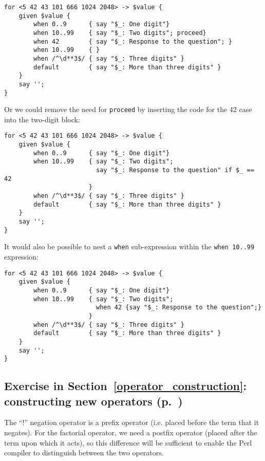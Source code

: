 \begin{verbatim}
for <5 42 43 101 666 1024 2048> -> $value {
    given $value {
        when 0..9      { say "$_: One digit"}
        when 10..99    { say "$_: Two digits"; proceed}
        when 42        { say "$_: Response to the question"; }
        when 10..99    { }
        when /^\d**3$/ { say "$_: Three digits" }
        default        { say "$_: More than three digits" }
    }
    say '';
}
\end{verbatim}

Or we could remove the need for {\tt proceed} by inserting 
the code for the 42 case into the two-digit block: 

\begin{verbatim}
for <5 42 43 101 666 1024 2048> -> $value {
    given $value {
        when 0..9      { say "$_: One digit"}
        when 10..99    { say "$_: Two digits"; 
                         say "$_: Response to the question" if $_ == 42
                       }
        when /^\d**3$/ { say "$_: Three digits" }
        default        { say "$_: More than three digits" }
    }
    say '';
}
\end{verbatim}

It would also be possible to nest a \verb'when' sub-expression 
within the \verb'when 10..99' expression:

\begin{verbatim}
for <5 42 43 101 666 1024 2048> -> $value {
    given $value {
        when 0..9      { say "$_: One digit"}
        when 10..99    { say "$_: Two digits"; 
                         when 42 {say "$_: Response to the question";}
                       }
        when /^\d**3$/ { say "$_: Three digits" }
        default        { say "$_: More than three digits" }
    }
    say '';
}
\end{verbatim}

\subsection{Exercise in Section~\ref{operator_construction}: constructing new operators (p.~\pageref{fact_operator})}
\label{sol_fact_operator}

The ``!'' negation operator is a prefix operator (i.e. placed 
before the term that it negates). For the factorial operator, 
we need a postfix operator (placed after the term upon which it 
acts), so this difference will be sufficient to enable the 
Perl compiler to distinguish between the two operators.

